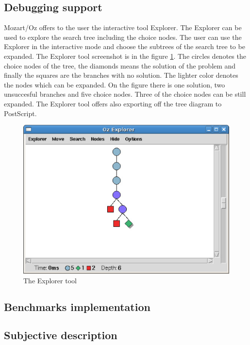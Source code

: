 \subsection{Debugging support}
Mozart/Oz offers to the user the interactive tool Explorer. The Explorer can be used to explore 
the search tree including the choice nodes. The user can use the Explorer in the 
interactive mode and choose the subtrees of the search tree to be expanded. 
 The Explorer tool screenshot is in the figure \ref{mozart:explorer}. The circles 
 denotes the choice nodes of the tree, the diamonds means the solution of
 the problem and finally the squares are the branches with no solution. The lighter color
 denotes the nodes which can be expanded. On the figure there is one solution, two 
 unsuccesful branches and five choice nodes. Three of the choice nodes can be still expanded.
 The Explorer tool offers also exporting off the tree diagram to PostScript.

\begin{figure}
\caption{\label{mozart:explorer}The Explorer tool}
\begin{center}
\includegraphics[scale=0.3]{images/screenshoty/explorer.eps}
\end{center}
\end{figure}

\subsection{Benchmarks implementation}


\subsection{Subjective description}